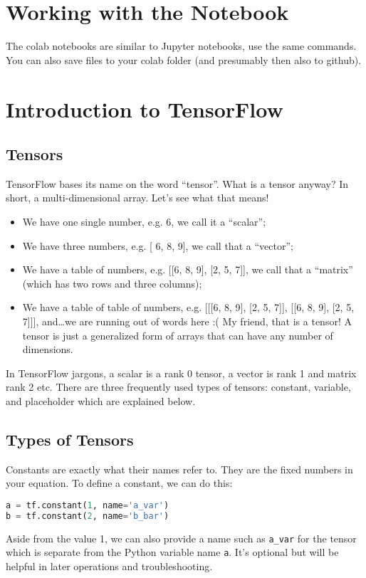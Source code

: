 \section{Working with the Notebook}

The colab notebooks are similar to Jupyter notebooks, use the same commands.
You can also save files to your colab folder (and presumably then also to github).

\section{Introduction to TensorFlow}

\subsection{Tensors}

TensorFlow bases its name on the word ``tensor''. What is a tensor anyway? In short, a multi-dimensional array. Let's see what that means!

\begin{itemize}
\item We have one single number, e.g. 6, we call it a ``scalar'';
\item We have three numbers, e.g. [ 6, 8, 9], we call that a ``vector'';
\item We have a table of numbers, e.g. [[6, 8, 9], [2, 5, 7]], we call that a ``matrix'' (which has two rows and three columns);
\item We have a table of table of numbers, e.g. [[[6, 8, 9], [2, 5, 7]], [[6, 8, 9], [2, 5, 7]]], and…we are running out of words here :( My friend, that is a tensor! A tensor is just a generalized form of arrays that can have any number of dimensions.
\end{itemize}

In TensorFlow jargons, a scalar is a rank 0 tensor, a vector is rank 1 and matrix rank 2 etc. There are three frequently used types of tensors: constant, variable, and placeholder which are explained below.

\subsection{Types of Tensors}

Constants are exactly what their names refer to. They are the fixed numbers in your equation. To define a constant, we can do this:

\begin{lstlisting}[language=Python]
a = tf.constant(1, name='a_var')
b = tf.constant(2, name='b_bar')
\end{lstlisting}
Aside from the value 1, we can also provide a name such as \lstinline{a_var} for the tensor which is separate from the Python variable name \lstinline{a}. It's optional but will be helpful in later operations and troubleshooting.

